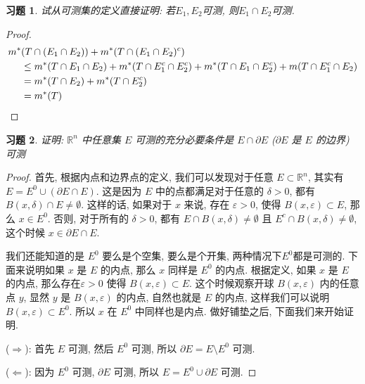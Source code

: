 \documentclass{article}
\newtheorem{exercise}{习题}
\begin{document}
\begin{exercise}
  试从可测集的定义直接证明: 若$E_1, E_2$可测, 则$E_1\cap E_2$可测.
\end{exercise}
\begin{proof}
  \begin{align*}
    m^*&(T\cap(E_1\cap E_2)) + m^*(T\cap(E_1\cap E_2)^c) \\
       &\leq m^*(T\cap E_1\cap E_2) + m^*(T\cap E_1^c \cap E_2^c) + m^*(T\cap E_1\cap E_2^c) + m(T\cap E_1^c \cap E_2) \\
       &= m^*(T\cap E_2) + m^*(T\cap E_2^c)\\
    &= m^*(T) \qedhere
  \end{align*}
\end{proof}
\begin{exercise}
  证明: $\mathbb{R}^n$ 中任意集 $E$ 可测的充分必要条件是 $E\cap \partial E$ ($\partial E$ 是 $E$ 的边界) 可测
\end{exercise}
\begin{proof}
  首先, 根据内点和边界点的定义, 我们可以发现对于任意 $ E\subset \mathbb{R}^n$, 其实有 $E = E^0 \cup (\partial E \cap E)$. 这是因为 $E$ 中的点都满足对于任意的 $\delta > 0$, 都有 $B(x, \delta) \cap E \not=\emptyset$. 这样的话, 如果对于 $x$ 来说, 存在 $\varepsilon > 0$, 使得 $B(x, \varepsilon) \subset E$, 那么 $x \in E^0$. 否则, 对于所有的 $\delta > 0$, 都有 $E\cap B(x,\delta) \not=\emptyset$ 且 $E^c\cap B(x,\delta) \not= \emptyset$, 这个时候 $x \in \partial E\cap E$.

  我们还能知道的是 $E^0$ 要么是个空集, 要么是个开集, 两种情况下$E^0$都是可测的. 下面来说明如果 $x$ 是 $E$ 的内点, 那么 $x$ 同样是 $E^0$ 的内点. 根据定义, 如果 $x$ 是 $E$ 的内点, 那么存在$\varepsilon > 0$ 使得 $B(x,\varepsilon) \subset E$. 这个时候观察开球 $B(x, \varepsilon)$ 内的任意点 $y$, 显然 $y$ 是 $B(x,\varepsilon)$ 的内点, 自然也就是  $E$ 的内点, 这样我们可以说明 $B(x, \varepsilon) \subset E^0$. 所以 $x$ 在 $E^0$ 中同样也是内点. 做好铺垫之后, 下面我们来开始证明.

  ($\Rightarrow$): 首先 $E$ 可测, 然后 $E^0$ 可测, 所以 $\partial E = E\setminus E^0$ 可测.
  
  ($\Leftarrow$): 因为 $E^0$ 可测, $\partial E$ 可测, 所以 $E = E^0\cup \partial E$ 可测.
\end{proof}
\end{document}

